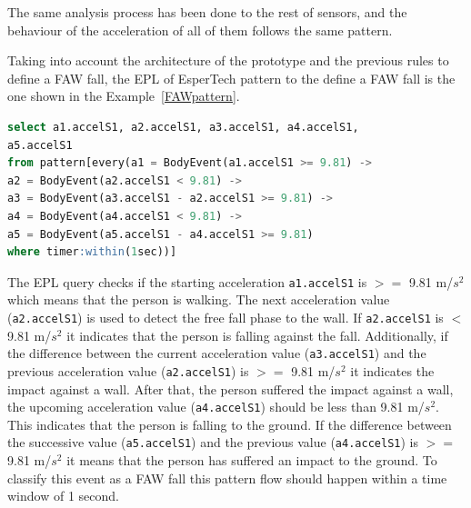 \documentclass[journal]{IEEEtran}
\begin{document}
The same analysis process has been done to the rest of sensors, and the behaviour of the acceleration of all of 
them follows the same pattern.

Taking into account the architecture of the prototype and the previous rules to define a FAW fall, the EPL of EsperTech
pattern to the define a FAW fall is the one shown in the Example~\ref{FAWpattern}.

\begin{lstlisting}[basicstyle=\ttfamily\scriptsize,language=SQL, mathescape,caption=FAW pattern,label=FAWpattern]
select a1.accelS1, a2.accelS1, a3.accelS1, a4.accelS1, 
a5.accelS1 
from pattern[every(a1 = BodyEvent(a1.accelS1 >= 9.81) -> 
a2 = BodyEvent(a2.accelS1 < 9.81) ->
a3 = BodyEvent(a3.accelS1 - a2.accelS1 >= 9.81) ->
a4 = BodyEvent(a4.accelS1 < 9.81) ->
a5 = BodyEvent(a5.accelS1 - a4.accelS1 >= 9.81) 
where timer:within(1sec))]
\end{lstlisting}




The EPL query checks if the starting acceleration \texttt{\small{a1.accelS1}} is $>=$ 9.81 m/$s^2$ which means that the person is walking. 
The next acceleration value (\texttt{\small{a2.accelS1}}) is used to detect the free fall phase to the wall. If \texttt{\small{a2.accelS1}} 
is $<$ 9.81 m/$s^2$ it indicates that the person is falling against the fall. Additionally, if the difference between 
the current acceleration value (\texttt{\small{a3.accelS1}}) and the previous acceleration value (\texttt{\small{a2.accelS1}}) is $>=$ 9.81 m/$s^2$ 
it indicates the impact against a wall. After that, the person suffered the impact against a wall, the upcoming 
acceleration value (\texttt{\small{a4.accelS1}}) should be less than 9.81 m/$s^2$. This indicates that the person is falling to 
the ground. If the difference between the successive value (\texttt{\small{a5.accelS1}}) and the previous value (\texttt{\small{a4.accelS1}}) 
is $>=$ 9.81 m/$s^2$ it means that the person has suffered an impact to the ground. To classify this event as 
a FAW fall this pattern flow should happen within a time window of 1 second.
\end{document}

